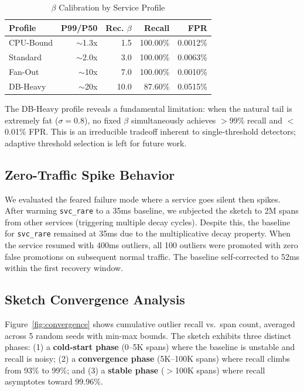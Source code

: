 \documentclass[sigconf,nonacm]{acmart}
\begin{document}
\begin{table}[h]
\caption{$\beta$ Calibration by Service Profile}
\label{tab:beta}
\centering
\small
\begin{tabular}{l r r r r}
\toprule
\textbf{Profile} & \textbf{P99/P50} & \textbf{Rec. $\beta$} & \textbf{Recall} & \textbf{FPR} \\
\midrule
CPU-Bound   & $\sim$1.3x  & 1.5  & 100.00\% & 0.0012\% \\
Standard    & $\sim$2.0x  & 3.0  & 100.00\% & 0.0063\% \\
Fan-Out     & $\sim$10x   & 7.0  & 100.00\% & 0.0010\% \\
DB-Heavy    & $\sim$20x   & 10.0 & 87.60\%  & 0.0515\% \\
\bottomrule
\end{tabular}
\end{table}

The DB-Heavy profile reveals a fundamental limitation: when the natural tail is extremely
fat ($\sigma=0.8$), no fixed $\beta$ simultaneously achieves $>$99\% recall and
$<$0.01\% FPR. This is an irreducible tradeoff inherent to single-threshold detectors;
adaptive threshold selection is left for future work.

\subsection{Zero-Traffic Spike Behavior}

We evaluated the feared failure mode where a service goes silent then spikes. After
warming \texttt{svc\_rare} to a 35ms baseline, we subjected the sketch to 2M spans
from other services (triggering multiple decay cycles). Despite this, the baseline for
\texttt{svc\_rare} remained at 35ms due to the multiplicative decay property. When the
service resumed with 400ms outliers, all 100 outliers were promoted with zero false
promotions on subsequent normal traffic. The baseline self-corrected to 52ms within the
first recovery window.

\subsection{Sketch Convergence Analysis}

Figure~\ref{fig:convergence} shows cumulative outlier recall vs.\ span count, averaged
across 5 random seeds with min-max bounds. The sketch exhibits three distinct phases:
(1) a \textbf{cold-start phase} (0--5K spans) where the baseline is unstable and recall
is noisy; (2) a \textbf{convergence phase} (5K--100K spans) where recall climbs from
93\% to 99\%; and (3) a \textbf{stable phase} ($>$100K spans) where recall asymptotes
toward 99.96\%.
\end{document}
